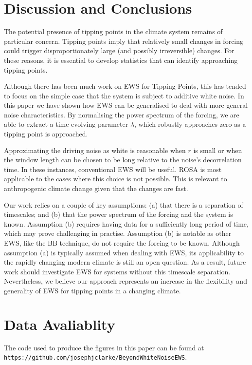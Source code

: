 \section{Discussion and Conclusions}
The potential presence of tipping points in the climate system remains of particular concern. 
Tipping points imply that relatively small changes in forcing could trigger
disproportionately large (and possibly irreversible) changes.
For these reasons, it is essential to develop
statistics that can identify approaching tipping points.

Although there has been much work on EWS for Tipping Points,
this has tended to focus on the simple case that the system is subject to additive white noise. 
In this paper we have shown how EWS can be generalised to deal with more general noise characteristics. By normalising the power spectrum of the forcing, we are able to extract a 
time-evolving parameter $\lambda$, which robustly approaches zero as a tipping point is approached.  

Approximating the driving noise as white is reasonable when $r$ is 
small or when the window length can be chosen to be long relative to the 
noise's decorrelation time. In these instances, conventional EWS will be useful. ROSA is most applicable to the cases where this choice is not
possible. This is relevant to anthropogenic climate change given that the changes are fast.

Our work relies on a couple of  key assumptions: (a) that there is a separation of timescales; and (b) that the power spectrum of the forcing and the system is known. Assumption (b)
requires having data for a sufficiently long period of time, which may 
prove challenging in practise. Assumption (b) is notable as other EWS, like the BB technique, do not require the forcing to be known.
Although assumption (a) is typically
assumed when dealing with EWS, its applicability
to the rapidly changing modern climate is still an open 
question.
As a result, future work should investigate EWS for systems without this timescale separation. Nevertheless, we believe our approach represents an increase in the flexibility and generality of EWS for tipping points in a changing climate. 

\section*{Data Avaliablity}
The code used to produce the figures in this paper can be found at \texttt{https://github.com/josephjclarke/BeyondWhiteNoiseEWS}.



